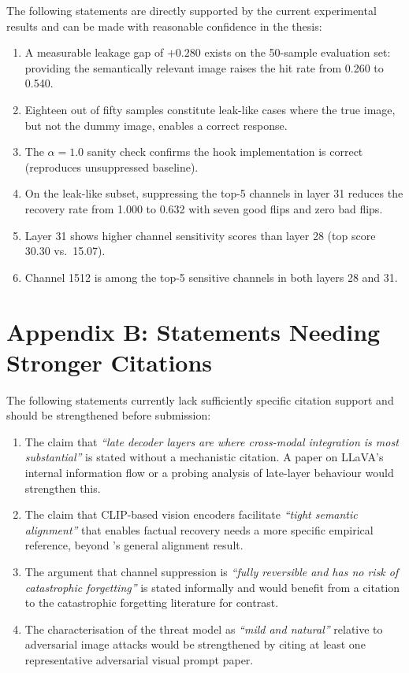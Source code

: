 \documentclass[12pt, a4paper]{article}
\begin{document}
The following statements are directly supported by the current experimental results and
can be made with reasonable confidence in the thesis:

\begin{enumerate}[leftmargin=*, itemsep=3pt]
  \item A measurable leakage gap of $+0.280$ exists on the 50-sample evaluation set:
    providing the semantically relevant image raises the hit rate from 0.260 to 0.540.
  \item Eighteen out of fifty samples constitute leak-like cases where the true image,
    but not the dummy image, enables a correct response.
  \item The $\alpha = 1.0$ sanity check confirms the hook implementation is correct
    (reproduces unsuppressed baseline).
  \item On the leak-like subset, suppressing the top-5 channels in layer 31 reduces
    the recovery rate from 1.000 to 0.632 with seven good flips and zero bad flips.
  \item Layer 31 shows higher channel sensitivity scores than layer 28
    (top score 30.30 vs.\ 15.07).
  \item Channel 1512 is among the top-5 sensitive channels in both layers 28 and 31.
\end{enumerate}

\section*{Appendix B: Statements Needing Stronger Citations}
\label{app:citations}

The following statements currently lack sufficiently specific citation support and
should be strengthened before submission:

\begin{enumerate}[leftmargin=*, itemsep=3pt]
  \item The claim that \emph{``late decoder layers are where cross-modal integration
    is most substantial''} is stated without a mechanistic citation.
    A paper on LLaVA's internal information flow or a probing analysis of late-layer
    behaviour would strengthen this.
  \item The claim that CLIP-based vision encoders facilitate \emph{``tight semantic
    alignment''} that enables factual recovery needs a more specific empirical
    reference, beyond \citet{clip2021}'s general alignment result.
  \item The argument that channel suppression is \emph{``fully reversible and has no
    risk of catastrophic forgetting''} is stated informally and would benefit from a
    citation to the catastrophic forgetting literature for contrast.
  \item The characterisation of the threat model as \emph{``mild and natural''}
    relative to adversarial image attacks would be strengthened by citing at least
    one representative adversarial visual prompt paper.
\end{enumerate}
\end{document}
